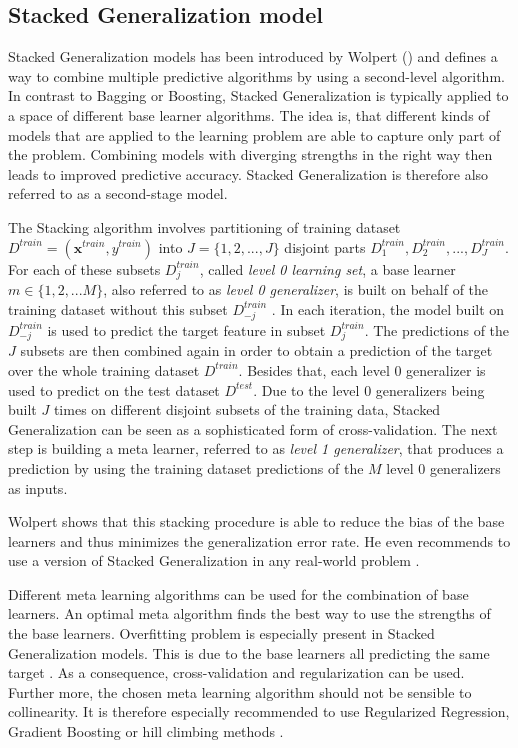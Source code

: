 \documentclass[12pt]{article}
\begin{document}
\subsection{Stacked Generalization model}\label{stacking}
Stacked Generalization models has been introduced by Wolpert (\citeyear{wolpert1992stacked}) and defines a way to combine multiple predictive algorithms by using a second-level algorithm. In contrast to Bagging or Boosting, Stacked Generalization is typically applied to a space of different base learner algorithms. The idea is, that different kinds of models that are applied to the learning problem are able to capture only part of the problem. Combining models with diverging strengths in the right way then leads to improved predictive accuracy. Stacked Generalization is therefore also referred to as a second-stage model.

The Stacking algorithm involves partitioning of training dataset $D^{train} = (\mathbf{x}^{train}, y^{train})$ into $J = \{1, 2,..., J\}$ disjoint parts $D^{train}_1, D^{train}_2,..., D^{train}_J$. For each of these subsets $D^{train}_j$, called \textit{level 0 learning set}, a base learner $m \in \{1,2,...M\}$, also referred to as \textit{level 0 generalizer}, is built on behalf of the training dataset without this subset $D^{train}_{-j}$ \citep[cp.]{wolpert1992stacked}. In each iteration, the model built on $D^{train}_{-j}$ is used to predict the target feature in subset $D^{train}_j$. The predictions of the $J$ subsets are then combined again in order to obtain a prediction of the target over the whole training dataset $D^{train}$. Besides that, each level 0 generalizer is used to predict on the test dataset $D^{test}$. Due to the level 0 generalizers being built $J$ times on different disjoint subsets of the training data, Stacked Generalization can be seen as a sophisticated form of cross-validation. The next step is building a meta learner, referred to as \textit{level 1 generalizer}, that produces a prediction by using the training dataset predictions of the $M$ level 0 generalizers as inputs. 

Wolpert shows that this stacking procedure is able to reduce the bias of the base learners and thus minimizes the generalization error rate. He even recommends to use a version of Stacked Generalization in any real-world problem \citep[p.2]{wolpert1992stacked}. 

Different meta learning algorithms can be used for the combination of base learners. An optimal meta algorithm finds the best way to use the strengths of the base learners. Overfitting problem is especially present in Stacked Generalization models. This is due to the base learners all predicting the same target \citep{online2017stacking}. As a consequence, cross-validation and regularization can be used. Further more, the chosen meta learning algorithm should not be sensible to collinearity. It is therefore especially recommended to use Regularized Regression, Gradient Boosting or hill climbing methods \citep{SASpaper}. 
\end{document}

